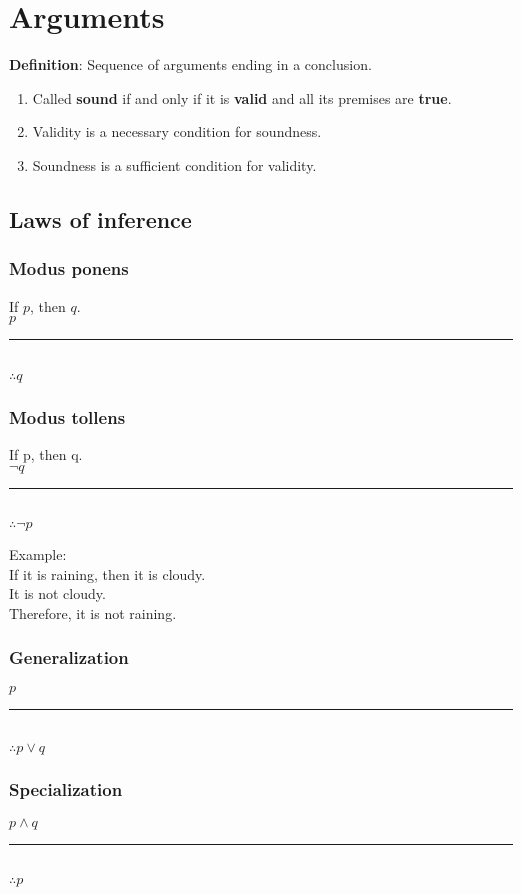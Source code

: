 \documentclass[12pt]{article}
\newcommand{\proofline}{\rule{0.75in}{0.5pt}}
\begin{document}
\section*{Arguments}

\textbf{Definition}: Sequence of arguments ending in a conclusion.

\begin{enumerate}
    \item Called \textbf{sound} if and only if it is \textbf{valid} and all its premises are \textbf{true}.
    \item Validity is a necessary condition for soundness.
    \item Soundness is a sufficient condition for validity.
\end{enumerate}

\subsection*{Laws of inference}

\subsubsection*{Modus ponens}
If $p$, then $q$.\\
$p$\\
\proofline\\
$\therefore q$

\subsubsection*{Modus tollens}

If p, then q.\\
$\lnot q$\\
\proofline\\
$\therefore \lnot p$

Example:\\
If it is raining, then it is cloudy.\\
It is not cloudy.\\
Therefore, it is not raining.

\subsubsection*{Generalization}
$p$\\
\proofline\\
$\therefore p \lor q$

\subsubsection*{Specialization}
$p \land q$\\
\proofline\\
$\therefore p$
\end{document}
